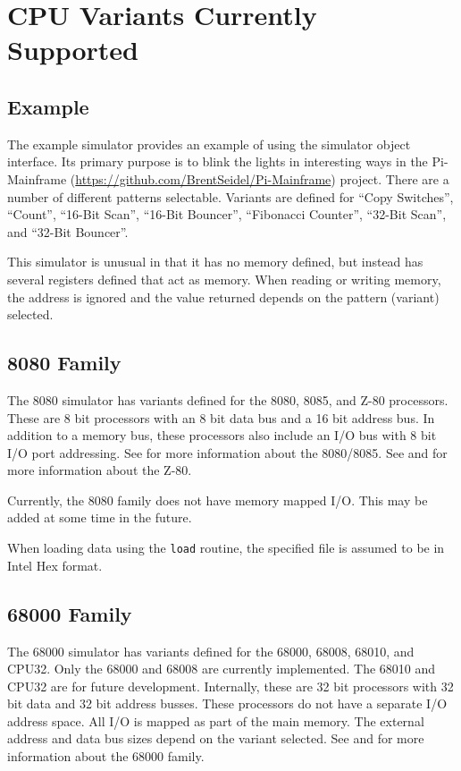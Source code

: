 \documentclass[10pt, openany]{book}
\newcommand{\function}[1]{\texttt{#1}}
\begin{document}
\chapter{CPU Variants Currently Supported}
\label{chap:CPUVar}
\section{Example}
The example simulator provides an example of using the simulator object interface.
Its primary purpose is to blink the lights in interesting ways in the Pi-Mainframe (\url{https://github.com/BrentSeidel/Pi-Mainframe}) project.
There are a number of different patterns selectable.
Variants are defined for ``Copy Switches'', ``Count'', ``16-Bit Scan'', ``16-Bit Bouncer'', ``Fibonacci Counter'', ``32-Bit Scan'', and ``32-Bit Bouncer''.

This simulator is unusual in that it has no memory defined, but instead has several registers defined that act as memory.
When reading or writing memory, the address is ignored and the value returned depends on the pattern (variant) selected.

\section{8080 Family}
The 8080 simulator has variants defined for the 8080, 8085, and Z-80 processors.
These are 8 bit processors with an 8 bit data bus and a 16 bit address bus.
In addition to a memory bus, these processors also include an I/O bus with 8 bit I/O port addressing.
See \cite{i8080} for more information about the 8080/8085.
See \cite{z80} and \cite{z80undoc} for more information about the Z-80.

Currently, the 8080 family does not have memory mapped I/O.  This may be added at some time in the future.

When loading data using the \function{load} routine, the specified file is assumed to be in Intel Hex format.

\section{68000 Family}
The 68000 simulator has variants defined for the 68000, 68008, 68010, and CPU32.
Only the 68000 and 68008 are currently implemented.
The 68010 and CPU32 are for future development.
Internally, these are 32 bit processors with 32 bit data and 32 bit address busses.
These processors do not have a separate I/O address space.
All I/O is mapped as part of the main memory.
The external address and data bus sizes depend on the variant selected.
See \cite{m68000a} and \cite{m68000b} for more information about the 68000 family.
\end{document}
